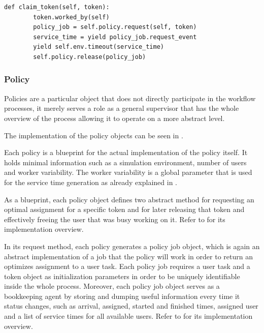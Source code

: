 \documentclass{seal_thesis}
\begin{document}
\begin{lstlisting}[caption=User task claim method,label=lst:user_task,style=CustomPython]
    def claim_token(self, token):
        token.worked_by(self)
        policy_job = self.policy.request(self, token)
        service_time = yield policy_job.request_event
        yield self.env.timeout(service_time)
        self.policy.release(policy_job)
\end{lstlisting}

\subsubsection{Policy}

Policies are a particular object that does not directly participate in the workflow processes, it merely serves a role as a general supervisor that has the whole overview of the process allowing it to operate on a more abstract level. 

The implementation of the policy objects can be seen in .


Each policy is a blueprint for the actual implementation of the policy itself. It holds minimal information such as a simulation environment, number of users and worker variability. The worker variability is a global parameter that is used for the service time generation as already explained in .

As a blueprint, each policy object defines two abstract method for requesting an optimal assignment for a specific token and for later releasing that token and effectively freeing the user that was busy working on it. Refer to  for its implementation overview.


In its request method, each policy generates a policy job object, which is again an abstract implementation of a job that the policy will work in order to return an optimizes assignment to a user task. Each policy job requires a user task and a token object as initialization parameters in order to be uniquely identifiable inside the whole process. Moreover, each policy job object serves as a bookkeeping agent by storing and dumping useful information every time it status changes, such as arrival, assigned, started and finished times, assigned user and a list of service times for all available users. Refer to  for its implementation overview.
\end{document}
